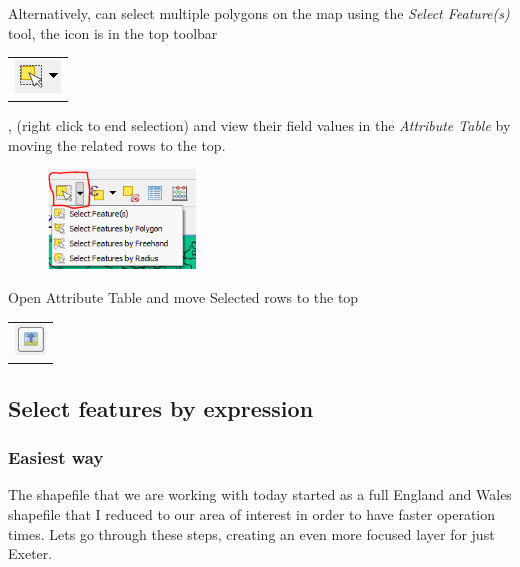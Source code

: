 Alternatively, can select multiple polygons on the map using the \textit{Select Feature(s)} tool, the icon is in the top toolbar
	\begin{tabular}{@{}c@{}}\includegraphics[width=4ex]{images/select_features_by_polygon_icon.png}\end{tabular}
, (right click to end selection) and view their field values in the \textit{Attribute Table} by moving the related rows to the top.

\begin{figure}[!h]
	\centering
	\includegraphics[width=0.35\textwidth]{images/select_features_by_polygon_dropdown.png}
	\caption{}
	\label{ft_fig_firstfig3}
\end{figure}
              
Open Attribute Table and move Selected rows to the top 
	\begin{tabular}{@{}c@{}}\includegraphics[width=4ex]{images/move_selection_to_top_icon.png}\end{tabular}
\null\newpage



\subsection{Select features by expression}

\subsubsection{Easiest way}
The shapefile that we are working with today started as a full England and Wales shapefile that I reduced to our area of interest in order to have faster operation times. Lets go through these steps, creating an even more focused layer for just Exeter.

